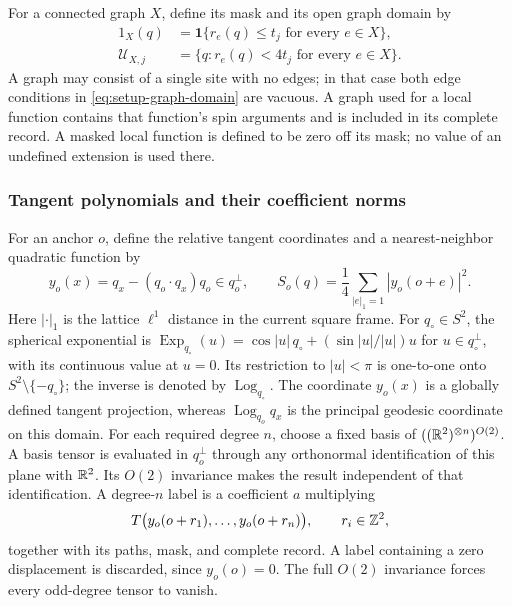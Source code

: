 For a connected graph $X$, define its mask and its open graph domain
by
\begin{equation}
 \begin{aligned}
 1_X(q)&=\mathbf 1\{r_e(q)\le t_j\text{ for every }e\in X\},\\
 \mathcal U_{X,j}&=\{q:r_e(q)<4t_j\text{ for every }e\in X\}.
 \end{aligned}
 \label{eq:setup-graph-domain}
\end{equation}
A graph may consist of a single site with no edges; in that case both
edge conditions in \eqref{eq:setup-graph-domain} are vacuous.
A graph used for a local function contains that function's spin
arguments and is included in its complete record.  A masked local
function is defined to be zero off its mask; no value of an undefined
extension is used there.

\subsubsection{Tangent polynomials and their coefficient norms}

For an anchor $o$, define the relative tangent coordinates and a
nearest-neighbor quadratic function by
\begin{equation}
 y_o(x)=q_x-(q_o\cdot q_x)q_o\in q_o^\perp,
 \qquad
 S_o(q)=\frac14\sum_{|e|_1=1}|y_o(o+e)|^2.
 \label{eq:setup-tangent-coordinates}
\end{equation}
Here $|\cdot|_1$ is the lattice $\ell^1$ distance in the current square
frame.  For $q_\circ\in S^2$, the spherical exponential is
$\operatorname{Exp}_{q_\circ}(u)=\cos|u|\,q_\circ+(\sin|u|/|u|)u$
for $u\in q_\circ^\perp$, with its continuous value at $u=0$.
Its restriction to $|u|<\pi$ is one-to-one onto
$S^2\setminus\{-q_\circ\}$; the inverse is denoted by
$\operatorname{Log}_{q_\circ}$.  The coordinate $y_o(x)$ is a globally
defined tangent projection, whereas $\operatorname{Log}_{q_o}q_x$ is
the principal geodesic coordinate on this domain.
For each required degree $n$, choose a fixed basis of
$((\mathbb R^2)^{\otimes n})^{O(2)}$.  A basis tensor is evaluated in
$q_o^\perp$ through any orthonormal identification of this plane with
$\mathbb R^2$.  Its $O(2)$ invariance makes the result independent of that
identification.  A degree-$n$ label is a coefficient $a$ multiplying
\[
 T\bigl(y_o(o+r_1),\ldots,y_o(o+r_n)\bigr),
 \qquad r_i\in\mathbb Z^2,
\]
together with its paths, mask, and complete record.  A label containing
a zero displacement is discarded, since $y_o(o)=0$.  The full $O(2)$
invariance forces every
odd-degree tensor to vanish.

